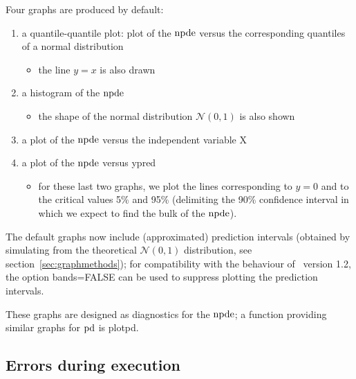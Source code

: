 \hskip 18pt Four graphs are produced by default:
\begin{enumerate}
\item a quantile-quantile plot: plot of the ${\rm npde}$ versus the corresponding quantiles of a normal distribution
   \begin{itemize}
   \item the line $y=x$ is also drawn
   \end{itemize}
\item a histogram of the ${\rm npde}$
   \begin{itemize}
   \item the shape of the normal distribution $\mathcal{N}(0,1)$ is also shown
   \end{itemize}
\item a plot of the ${\rm npde}$ versus the independent variable X
\item a plot of the ${\rm npde}$ versus ypred
   \begin{itemize}
   \item for these last two graphs, we plot the lines corresponding to $y=0$ and to the critical values 5\% and 95\% (delimiting the 90\% confidence interval in which we expect to find the bulk of the ${\rm npde}$).
   \end{itemize}   
\end{enumerate}
The default graphs now include (approximated) prediction intervals (obtained by simulating from the theoretical $\mathcal{N}(0,1)$ distribution, see section~\ref{sec:graphmethods}); for compatibility with the behaviour of \npde~version 1.2, the option {\sf bands=FALSE} can be used to suppress plotting the prediction intervals.

These graphs are designed as diagnostics for the ${\rm npde}$; a function providing similar graphs for ${\rm pd}$ is {\sf plotpd}.

\subsection{Errors during execution}

